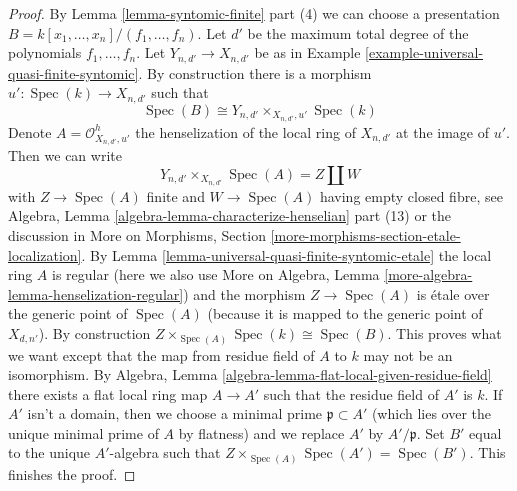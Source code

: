 \documentclass[10pt,a4paper]{amsart}
\theoremstyle{plain}
\theoremstyle{definition}
\theoremstyle{remark}
\numberwithin{equation}{subsection}
\def\Spec{\mathop{\mathrm{Spec}}}
\begin{document}
\begin{proof}
\medskip\noindent
By Lemma \ref{lemma-syntomic-finite} part (4) we can choose a presentation
$B = k[x_1, \ldots, x_n]/(f_1, \ldots, f_n)$.
Let $d'$ be the maximum total degree of the polynomials $f_1, \ldots, f_n$.
Let $Y_{n, d'} \to X_{n, d'}$ be as in
Example \ref{example-universal-quasi-finite-syntomic}.
By construction there is a morphism $u' : \Spec(k) \to X_{n, d'}$
such that
$$
\Spec(B) \cong Y_{n, d'} \times_{X_{n, d'}, u'} \Spec(k)
$$
Denote $A = \mathcal{O}_{X_{n, d'}, u'}^h$ the henselization of the
local ring of $X_{n, d'}$ at the image of $u'$. Then we can write
$$
Y_{n, d'} \times_{X_{n, d'}} \Spec(A) = Z \amalg W
$$
with $Z \to \Spec(A)$ finite and $W \to \Spec(A)$ having empty
closed fibre, see
Algebra, Lemma \ref{algebra-lemma-characterize-henselian} part (13)
or the discussion in More on Morphisms, Section
\ref{more-morphisms-section-etale-localization}.
By Lemma \ref{lemma-universal-quasi-finite-syntomic-etale}
the local ring $A$ is regular (here we also use
More on Algebra, Lemma \ref{more-algebra-lemma-henselization-regular})
and the morphism $Z \to \Spec(A)$ is \'etale over the generic point of
$\Spec(A)$ (because it is mapped to the generic point of $X_{d, n'}$).
By construction $Z \times_{\Spec(A)} \Spec(k) \cong \Spec(B)$.
This proves what we want except that the map from
residue field of $A$ to $k$ may not be an isomorphism.
By Algebra, Lemma \ref{algebra-lemma-flat-local-given-residue-field}
there exists a flat local ring map $A \to A'$ such that the residue
field of $A'$ is $k$. If $A'$ isn't a domain, then we choose a
minimal prime $\mathfrak p \subset A'$ (which lies over the
unique minimal prime of $A$ by flatness) and we replace
$A'$ by $A'/\mathfrak p$. Set $B'$ equal to the unique $A'$-algebra
such that $Z \times_{\Spec(A)} \Spec(A') = \Spec(B')$.
This finishes the proof.
\end{proof}
\end{document}
